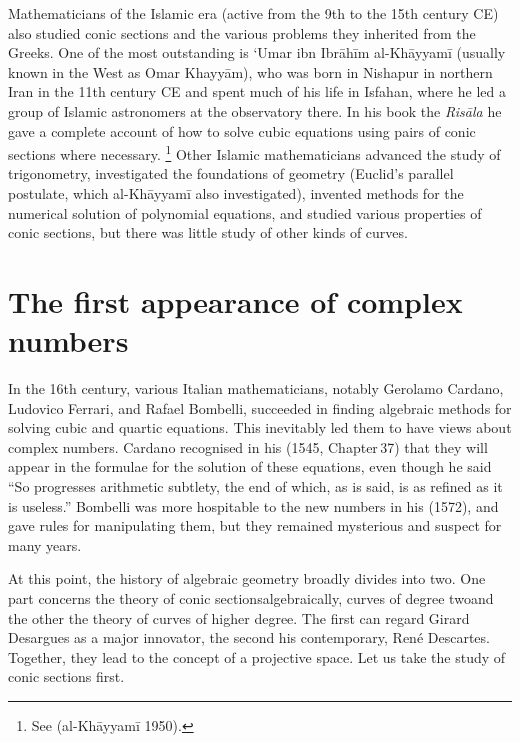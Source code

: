 Mathematicians of the Islamic era  (active from the 9th to the 15th
century CE)
also studied conic sections and the various problems they inherited from
the Greeks. One of the most outstanding is `Umar ibn Ibr\={a}h\={i}m
al-Kh\={a}yyam\={i} (usually known in the West as Omar Khayy\={a}m),
who was born in Nishapur in northern Iran  in the 11th century CE and
spent much of his life in Isfahan, where he led a group of Islamic
astronomers at the observatory there. In his book the \emph{Ris\={a}la} he
 gave a complete account of how to solve cubic equations using pairs
 of conic sections where necessary.%
\footnote{See (al-Kh\={a}yyam\={i} 1950).} 
%
Other Islamic mathematicians advanced the study of trigonometry,
 investigated the foundations of geometry (Euclid's parallel postulate,
 which al-Kh\={a}yyam\={i} also investigated), invented methods for
 the numerical solution of polynomial equations, and studied various
 properties of conic sections, but there was little study of other kinds
 of curves.

\section{The first appearance of complex numbers}
In the 16th century, various Italian mathematicians, notably Gerolamo
Cardano, Ludovico Ferrari,  and Rafael Bombelli, succeeded in finding
algebraic methods for solving cubic and quartic equations. This inevitably
led them to have views about complex numbers. Cardano recognised in
his  (1545, Chapter\,37) that they will appear in the formulae for
the solution of these equations, even though he said ``So progresses
arithmetic subtlety, the end of which, as is said, is as refined as it is
useless.'' Bombelli was more hospitable to the new numbers in his  (1572),
and gave rules for manipulating them, but they remained mysterious and
suspect for many years.



At this point, the history of algebraic geometry broadly divides into
two. One part concerns the theory of conic sections\emdash algebraically,
curves of degree two\emdash and the other the theory of curves of higher
degree. The first can regard Girard Desargues as a major innovator,
the second his contemporary,  Ren\'e Descartes. Together, they lead
to the concept of a projective space. Let us take the study of conic
sections first.


